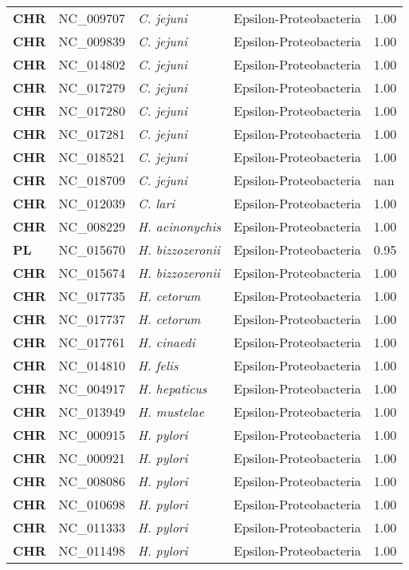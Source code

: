 \begin{adjustwidth}{-3cm}{2cm}
{\begin{supertabular}{>{\bfseries}l|p{0.1\textwidth}p{0.14\textwidth}l|l}
CHR & NC\_009707 & \textit{C. jejuni} & Epsilon-Proteobacteria & 1.00\\
CHR & NC\_009839 & \textit{C. jejuni} & Epsilon-Proteobacteria & 1.00\\
CHR & NC\_014802 & \textit{C. jejuni} & Epsilon-Proteobacteria & 1.00\\
CHR & NC\_017279 & \textit{C. jejuni} & Epsilon-Proteobacteria & 1.00\\
CHR & NC\_017280 & \textit{C. jejuni} & Epsilon-Proteobacteria & 1.00\\
CHR & NC\_017281 & \textit{C. jejuni} & Epsilon-Proteobacteria & 1.00\\
CHR & NC\_018521 & \textit{C. jejuni} & Epsilon-Proteobacteria & 1.00\\
CHR & NC\_018709 & \textit{C. jejuni} & Epsilon-Proteobacteria & nan\\
CHR & NC\_012039 & \textit{C. lari} & Epsilon-Proteobacteria & 1.00\\
CHR & NC\_008229 & \textit{H. acinonychis} & Epsilon-Proteobacteria & 1.00\\
PL & NC\_015670 & \textit{H. bizzozeronii} & Epsilon-Proteobacteria & 0.95\\
CHR & NC\_015674 & \textit{H. bizzozeronii} & Epsilon-Proteobacteria & 1.00\\
CHR & NC\_017735 & \textit{H. cetorum} & Epsilon-Proteobacteria & 1.00\\
CHR & NC\_017737 & \textit{H. cetorum} & Epsilon-Proteobacteria & 1.00\\
CHR & NC\_017761 & \textit{H. cinaedi} & Epsilon-Proteobacteria & 1.00\\
CHR & NC\_014810 & \textit{H. felis} & Epsilon-Proteobacteria & 1.00\\
CHR & NC\_004917 & \textit{H. hepaticus} & Epsilon-Proteobacteria & 1.00\\
CHR & NC\_013949 & \textit{H. mustelae} & Epsilon-Proteobacteria & 1.00\\
CHR & NC\_000915 & \textit{H. pylori} & Epsilon-Proteobacteria & 1.00\\
CHR & NC\_000921 & \textit{H. pylori} & Epsilon-Proteobacteria & 1.00\\
CHR & NC\_008086 & \textit{H. pylori} & Epsilon-Proteobacteria & 1.00\\
CHR & NC\_010698 & \textit{H. pylori} & Epsilon-Proteobacteria & 1.00\\
CHR & NC\_011333 & \textit{H. pylori} & Epsilon-Proteobacteria & 1.00\\
CHR & NC\_011498 & \textit{H. pylori} & Epsilon-Proteobacteria & 1.00\\

\end{supertabular}}
\end{adjustwidth}
